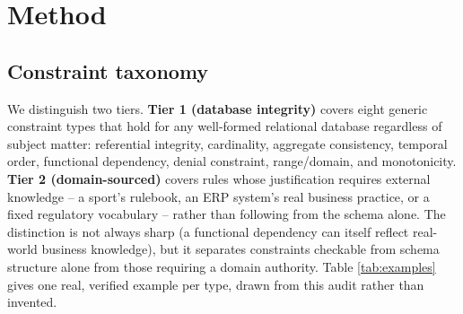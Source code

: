 \documentclass[11pt]{article}
\begin{document}
\section{Method}

\subsection{Constraint taxonomy}

We distinguish two tiers. \textbf{Tier 1 (database integrity)} covers eight generic constraint
types that hold for any well-formed relational database regardless of subject matter:
referential integrity, cardinality, aggregate consistency, temporal order, functional
dependency, denial constraint, range/domain, and monotonicity. \textbf{Tier 2
(domain-sourced)} covers rules whose justification requires external knowledge -- a sport's
rulebook, an ERP system's real business practice, or a fixed regulatory vocabulary -- rather
than following from the schema alone. The distinction is not always sharp (a functional
dependency can itself reflect real-world business knowledge), but it separates constraints
checkable from schema structure alone from those requiring a domain authority. Table
\ref{tab:examples} gives one real, verified example per type, drawn from this audit rather
than invented.
\end{document}
